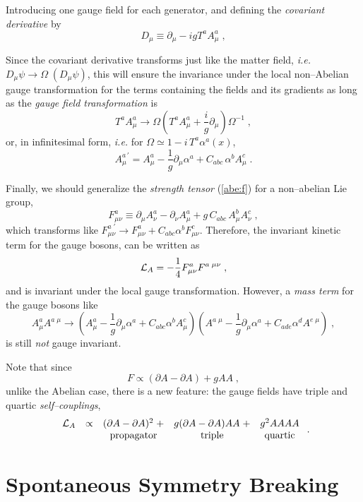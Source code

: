 \documentclass[12pt]{report}
\newcommand{\lag}{{\cal L}}
\newcommand{\del}{\partial}
\newcommand{\ba}{\begin{array}}
\newcommand{\ea}{\end{array}}
\begin{document}
Introducing one gauge field for each generator, and defining the
{\it  covariant derivative} by 
\[
D_\mu \equiv \del_\mu - i g T^a A_\mu^a \; ,
\]

Since the covariant derivative transforms just like the matter field,
{\it i.e.}  $D_\mu \psi \to \Omega \; (D_\mu \psi)$, this will ensure
the invariance under the local non--Abelian gauge transformation for
the terms containing the fields and its gradients as long as the
{\it gauge field transformation} is
\[
T^a A^a_\mu \to   \Omega \left(T^a A^a_\mu + 
\frac{i}{g} \del_\mu \right) \Omega^{-1} \; , 
\]
or, in infinitesimal form, {\it i.e.} for 
$\Omega \simeq 1 - i \, T^a \alpha^a(x)$, 
\[
A^{a \, \prime}_\mu = A^a_\mu - \frac{1}{g} \del_\mu \alpha^a +
C_{abc} \, \alpha^b A^c_\mu \; .
\]

Finally, we should generalize the {\it  strength tensor} (\ref{abe:f})
for a non--abelian Lie group,
\begin{equation}
F_{\mu\nu}^a \equiv \del_\mu A_\nu^a - \del_\nu A_\mu^a + g \, 
C_{abc} \, A_\mu^b A_\nu^c \; ,
\label{nonab:f}
\end{equation}
which transforms like $F_{\mu\nu}^{a \; \prime} \to F_{\mu\nu}^a +
C_{abc} \alpha^b F_{\mu\nu}^c$. Therefore, the invariant kinetic term
for the gauge bosons, can be written as 
\begin{equation}
\lag_A = - \frac{1}{4} F_{\mu\nu}^a F^{a \; \mu\nu} \; ,
\label{nonab:l}
\end{equation}
and is invariant under the local gauge transformation. However, a
{\it mass term} for the gauge bosons like 
\[
A_\mu^a A^{a \; \mu} \to 
\left( A^a_\mu - \frac{1}{g} \del_\mu \alpha^a + C_{abc} \alpha^b
A^c_\mu \right) 
\left( A^{a \; \mu} - \frac{1}{g} \del_\mu \alpha^a + C_{ade}
\alpha^d A^{e \; \mu} \right) \; ,
\] 
is still {\it not} gauge invariant.

Note that since
\[
F \propto (\del A - \del A) + g A A \; , 
\]
unlike the Abelian case, there is a new feature: the gauge fields
have triple and quartic {\it self--couplings}, 
\[
\ba{ccccc}
\lag_A & \propto & (\del A - \del A)^2 \; + & g (\del A - \del A) A A
\; + & g^2 A A A A \\
&&\mbox{propagator} & \mbox{triple} & \mbox{quartic}\\
\ea \; .
\]

\section{Spontaneous Symmetry Breaking} \label{ssb} \indent
\end{document}
